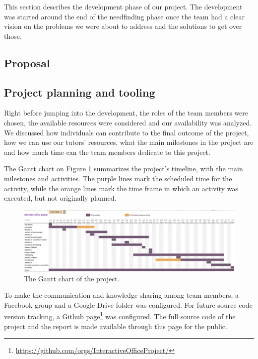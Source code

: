 This section describes the development phase of our project. The development was started around the end of the needfinding phase once the team had a clear vision on the problems we were about to address and the solutions to get over those.

\subsection{Proposal}


\subsection{Project planning and tooling}
Right before jumping into the development, the roles of the team members were chosen, the available resources were considered and our availability was analyzed. We discussed how individuals can contribute to the final outcome of the project, how we can use our tutors' resources, what the main milestones in the project are and how much time can the team members dedicate to this project. 

The Gantt chart on Figure \ref{gantt-chart} summarizes the project's timeline, with the main milestones and activities. The purple lines mark the scheduled time for the activity, while the orange lines mark the time frame in which an activity was executed, but not originally planned.
 
\begin{figure}[h] 
		\begin{center}
			\includegraphics[width=1\textwidth]{images/gantt-chart.png}
			\caption{The Gantt chart of the project.}
			\label{gantt-chart}
		\end{center}
	\end{figure} 
 
To make the communication and knowledge sharing among team members, a Facebook group and a Google Drive folder was configured. For future source code version tracking, a Github page\footnote{\url{https://github.com/orgs/InteractiveOfficeProject/}} was configured. The full source code of the project and the report is made available through this page for the public. 

